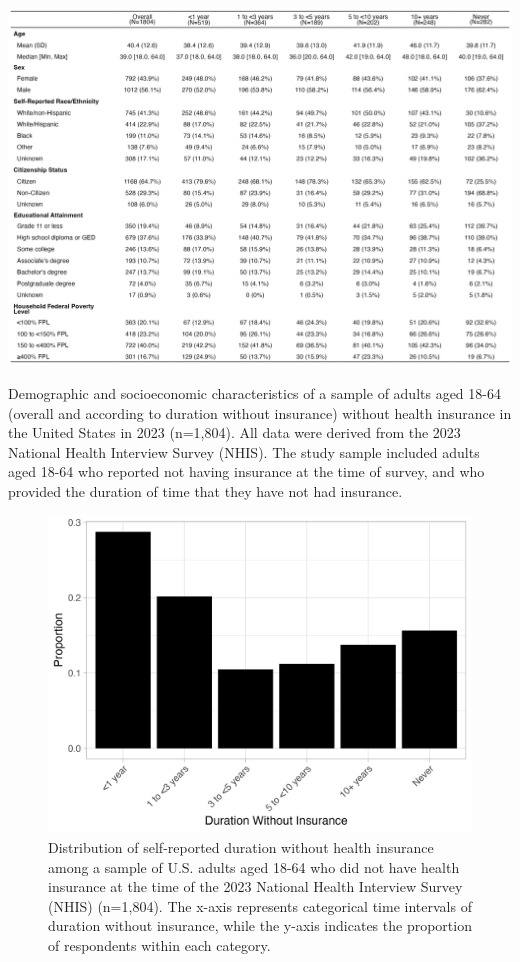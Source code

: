 \documentclass[12pt]{article}
\begin{document}
\begin{landscape}
  \begin{table}[H]
    \includegraphics[width=22cm]{figures/table_1.png}
    \caption{Demographic and socioeconomic characteristics of a sample of adults aged 18-64 (overall and according to duration without insurance) without health insurance in the United States in 2023 (n=1,804). All data were derived from the 2023 National Health Interview Survey (NHIS). The study sample included adults aged 18-64 who reported not having insurance at the time of survey, and who provided the duration of time that they have not had insurance.}
  \end{table}
\end{landscape}

\begin{figure}[H]
  \centering
  \includegraphics[width=15cm]{figures/duration_no_insurance.png}
  \caption{Distribution of self-reported duration without health insurance among a sample of U.S. adults aged 18-64 who did not have health insurance at the time of the 2023 National Health Interview Survey (NHIS) (n=1,804). The x-axis represents categorical time intervals of duration without insurance, while the y-axis indicates the proportion of respondents within each category.}
\end{figure}
\end{document}
